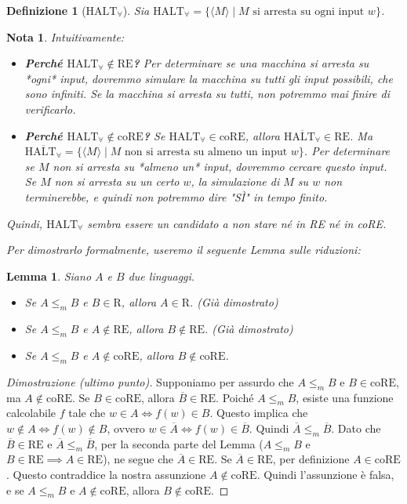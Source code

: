 \documentclass[a4paper]{article}
\newtheorem{definition}{Definizione}
\newtheorem{lemma}{Lemma}
\newtheorem{remark}{Nota}
\begin{document}
\begin{definition}[$\text{HALT}_\forall$]
Sia $\text{HALT}_\forall = \{ \langle M \rangle \mid M \text{ si arresta su ogni input } w \}$.
\end{definition}

\begin{remark}
Intuitivamente:
\begin{itemize}
    \item \textbf{Perché $\text{HALT}_\forall \notin \text{RE}$?} Per determinare se una macchina si arresta su *ogni* input, dovremmo simulare la macchina su tutti gli input possibili, che sono infiniti. Se la macchina si arresta su tutti, non potremmo mai finire di verificarlo.
    \item \textbf{Perché $\text{HALT}_\forall \notin \text{coRE}$?} Se $\text{HALT}_\forall \in \text{coRE}$, allora $\overline{\text{HALT}_\forall} \in \text{RE}$. Ma $\overline{\text{HALT}_\forall} = \{ \langle M \rangle \mid M \text{ non si arresta su almeno un input } w \}$. Per determinare se $M$ non si arresta su *almeno un* input, dovremmo cercare questo input. Se $M$ non si arresta su un certo $w$, la simulazione di $M$ su $w$ non terminerebbe, e quindi non potremmo dire "SÌ" in tempo finito.
\end{itemize}
Quindi, $\text{HALT}_\forall$ sembra essere un candidato a non stare né in RE né in coRE.

Per dimostrarlo formalmente, useremo il seguente Lemma sulle riduzioni:
\end{remark}

\begin{lemma}
Siano $A$ e $B$ due linguaggi.
\begin{itemize}
    \item Se $A \le_m B$ e $B \in \text{R}$, allora $A \in \text{R}$. (Già dimostrato)
    \item Se $A \le_m B$ e $A \notin \text{RE}$, allora $B \notin \text{RE}$. (Già dimostrato)
    \item Se $A \le_m B$ e $A \notin \text{coRE}$, allora $B \notin \text{coRE}$.
\end{itemize}
\end{lemma}
\begin{proof}[Dimostrazione (ultimo punto)]
Supponiamo per assurdo che $A \le_m B$ e $B \in \text{coRE}$, ma $A \notin \text{coRE}$.
Se $B \in \text{coRE}$, allora $\overline{B} \in \text{RE}$.
Poiché $A \le_m B$, esiste una funzione calcolabile $f$ tale che $w \in A \iff f(w) \in B$.
Questo implica che $w \notin A \iff f(w) \notin B$, ovvero $w \in \overline{A} \iff f(w) \in \overline{B}$.
Quindi $\overline{A} \le_m \overline{B}$.
Dato che $\overline{B} \in \text{RE}$ e $\overline{A} \le_m \overline{B}$, per la seconda parte del Lemma ($A \le_m B$ e $B \in \text{RE} \implies A \in \text{RE}$), ne segue che $\overline{A} \in \text{RE}$.
Se $\overline{A} \in \text{RE}$, per definizione $A \in \text{coRE}$. Questo contraddice la nostra assunzione $A \notin \text{coRE}$.
Quindi l'assunzione è falsa, e se $A \le_m B$ e $A \notin \text{coRE}$, allora $B \notin \text{coRE}$.
\end{proof}
\end{document}
